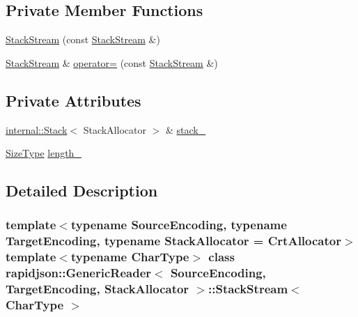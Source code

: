 \subsection*{Private Member Functions}
\begin{DoxyCompactItemize}
\item 
\mbox{\hyperlink{classrapidjson_1_1_generic_reader_1_1_stack_stream_aefa510439cbd8ad697725f9c53d5f04a}{Stack\+Stream}} (const \mbox{\hyperlink{classrapidjson_1_1_generic_reader_1_1_stack_stream}{Stack\+Stream}} \&)
\item 
\mbox{\hyperlink{classrapidjson_1_1_generic_reader_1_1_stack_stream}{Stack\+Stream}} \& \mbox{\hyperlink{classrapidjson_1_1_generic_reader_1_1_stack_stream_a624972cddcd4df10dbc43bae2cfaedf9}{operator=}} (const \mbox{\hyperlink{classrapidjson_1_1_generic_reader_1_1_stack_stream}{Stack\+Stream}} \&)
\end{DoxyCompactItemize}
\subsection*{Private Attributes}
\begin{DoxyCompactItemize}
\item 
\mbox{\hyperlink{classrapidjson_1_1internal_1_1_stack}{internal\+::\+Stack}}$<$ Stack\+Allocator $>$ \& \mbox{\hyperlink{classrapidjson_1_1_generic_reader_1_1_stack_stream_a9fb3b8e374497248e7b4dedd65983838}{stack\+\_\+}}
\item 
\mbox{\hyperlink{namespacerapidjson_a44eb33eaa523e36d466b1ced64b85c84}{Size\+Type}} \mbox{\hyperlink{classrapidjson_1_1_generic_reader_1_1_stack_stream_aacdc751831a6c54e3c89a63c8f0a2735}{length\+\_\+}}
\end{DoxyCompactItemize}


\subsection{Detailed Description}
\subsubsection*{template$<$typename Source\+Encoding, typename Target\+Encoding, typename Stack\+Allocator = Crt\+Allocator$>$\newline
template$<$typename Char\+Type$>$\newline
class rapidjson\+::\+Generic\+Reader$<$ Source\+Encoding, Target\+Encoding, Stack\+Allocator $>$\+::\+Stack\+Stream$<$ Char\+Type $>$}



